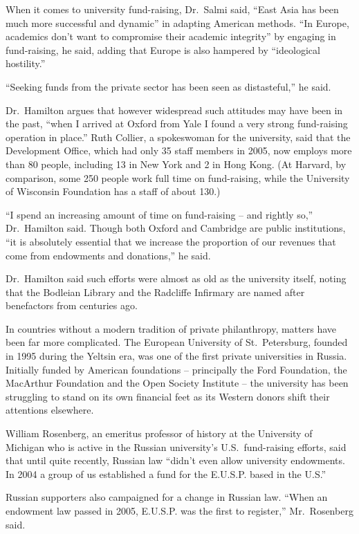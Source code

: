 ﻿\documentclass[12pt]{article}
\begin{document}
When it comes to university fund-raising, Dr.~Salmi said, ``East Asia has been much more successful
and dynamic'' in adapting American methods. ``In Europe, academics don't want to compromise their
academic integrity'' by engaging in fund-raising, he said, adding that Europe is also hampered by
``ideological hostility.''

``Seeking funds from the private sector has been seen as distasteful,'' he said.

Dr.~Hamilton argues that however widespread such attitudes may have been in the past, ``when I
arrived at Oxford from Yale I found a very strong fund-raising operation in place.'' Ruth Collier, a
spokeswoman for the university, said that the Development Office, which had only 35 staff members in
2005, now employs more than 80 people, including 13 in New York and 2 in Hong Kong. (At Harvard, by
comparison, some 250 people work full time on fund-raising, while the University of Wisconsin
Foundation has a staff of about 130.)

``I spend an increasing amount of time on fund-raising -- and rightly so,'' Dr.~Hamilton said.
Though both Oxford and Cambridge are public institutions, ``it is absolutely essential that we
increase the proportion of our revenues that come from endowments and donations,'' he said.

Dr.~Hamilton said such efforts were almost as old as the university itself, noting that the Bodleian
Library and the Radcliffe Infirmary are named after benefactors from centuries ago.

In countries without a modern tradition of private philanthropy, matters have been far more
complicated. The European University of St.~Petersburg, founded in 1995 during the Yeltsin era, was
one of the first private universities in Russia. Initially funded by American foundations --
principally the Ford Foundation, the MacArthur Foundation and the Open Society Institute -- the
university has been struggling to stand on its own financial feet as its Western donors shift their
attentions elsewhere.

William Rosenberg, an emeritus professor of history at the University of Michigan who is active in
the Russian university's U.S.~fund-raising efforts, said that until quite recently, Russian law
``didn't even allow university endowments. In 2004 a group of us established a fund for the E.U.S.P.
based in the U.S.''

Russian supporters also campaigned for a change in Russian law. ``When an endowment law passed in
2005, E.U.S.P. was the first to register,'' Mr.~Rosenberg said.
\end{document}
